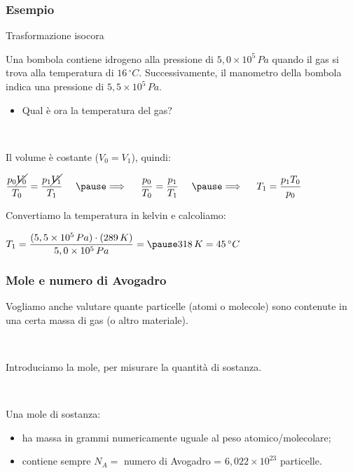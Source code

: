 \documentclass[]{beamer}
\theoremstyle{plain}
\begin{document}
\begin{frame}
\frametitle{Esempio}
\begin{exampleblock}{Trasformazione isocora}
{\small Una bombola contiene idrogeno alla pressione di $ 5,0 \times 10^5 \, Pa $ quando il gas si trova alla temperatura di $ 16 \, ^\circ C $. Successivamente, il manometro della bombola indica una pressione di $ 5,5 \times 10^5 \, Pa $.
\begin{itemize}
  \item Qual è ora la temperatura del gas?
\end{itemize}
}
\end{exampleblock}\pause

~

Il volume è costante ($ V_0 = V_1 $), quindi:
\begin{center}
$ \dfrac{p_0 \cancel{V_0}}{T_0} = \dfrac{p_1 \cancel{V_1}}{T_1} ~~~~\pause \Longrightarrow  ~~~~ \dfrac{p_0}{T_0} = \dfrac{p_1}{T_1}~~~~\pause \Longrightarrow  ~~~~ T_1 = \dfrac{p_1 T_0}{p_0} $
\end{center}\pause
Convertiamo la temperatura in kelvin e calcoliamo:
\begin{center}
$ T_1 = \dfrac{(5,5 \times 10^5 \, Pa) \cdot (289 \, K)}{5,0 \times 10^5 \, Pa} =\pause 318 \, K = 45 \, ^\circ C$
\end{center}
\end{frame}



\begin{frame}
\frametitle{Mole e numero di Avogadro}
Vogliamo anche valutare quante particelle (atomi o molecole) sono contenute in una certa massa di gas (o altro materiale).\pause

~

Introduciamo la \alert<2->{mole}, per misurare la \alert<2>{quantità di sostanza}.\pause

~

Una mole di sostanza:
\begin{itemize}
  \item ha massa in grammi \alert<3>{numericamente uguale al peso atomico/molecolare};\pause
  \item contiene sempre $ N_A = $ \alert<4>{numero di Avogadro = $ 6,022 \times 10^{23} $} particelle.
\end{itemize}
\end{frame}
\end{document}
